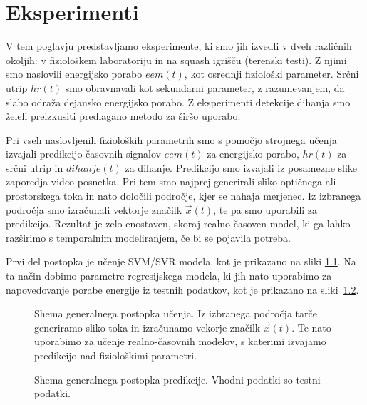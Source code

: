 \chapter{Eksperimenti}\label{sec:eksperimenti}
V tem poglavju predstavljamo eksperimente, ki smo jih izvedli v dveh različnih okoljih: v fiziološkem laboratoriju in na squash igrišču (terenski testi). Z njimi smo naslovili energijsko porabo $eem(t)$, kot osrednji fiziološki parameter. Srčni utrip $hr(t)$ smo obravnavali kot sekundarni parameter, z razumevanjem, da slabo odraža dejansko energijsko porabo. Z eksperimenti detekcije dihanja smo želeli preizkusiti predlagano metodo za širšo uporabo.

Pri vseh naslovljenih fizioloških parametrih smo s pomočjo strojnega učenja izvajali predikcijo časovnih signalov $eem(t)$ za energijsko porabo, $hr(t)$ za srčni utrip in $dihanje(t)$ za dihanje. Predikcijo smo izvajali iz posamezne slike zaporedja video posnetka. Pri tem smo najprej generirali sliko optičnega ali prostorskega toka in nato določili področje, kjer se nahaja merjenec. Iz izbranega področja smo izračunali vektorje značilk $\vec{x}(t)$, te pa smo uporabili za predikcijo. Rezultat je zelo enostaven, skoraj realno-časoven model, ki ga lahko razširimo s temporalnim modeliranjem, če bi se pojavila potreba. 

Prvi del postopka je učenje SVM/SVR modela, kot je prikazano na sliki \ref{fig:shema-generalnega-postopka01}. Na ta način dobimo parametre regresijskega modela, ki jih nato uporabimo za napovedovanje porabe energije iz testnih podatkov, kot je prikazano na sliki~\ref{fig:shema-generalnega-postopka02}.

\begin{figure}[!htb]
	\centering
	\resizebox{\columnwidth}{!}{}
	\caption[Shema generalnega postopka učenja]{Shema generalnega postopka učenja. Iz izbranega področja tarče generiramo sliko toka in izračunamo vekorje značilk $\vec{x}(t)$. Te nato uporabimo za učenje realno-časovnih modelov, s katerimi izvajamo predikcijo nad fiziološkimi parametri.}
	\label{fig:shema-generalnega-postopka01}
\end{figure}

\begin{figure}[!htb]
	\centering
	\resizebox{\columnwidth}{!}{}
	\caption[Shema generalnega postopka predikcije]{Shema generalnega postopka predikcije. Vhodni podatki so testni podatki.}
	\label{fig:shema-generalnega-postopka02}
\end{figure}

